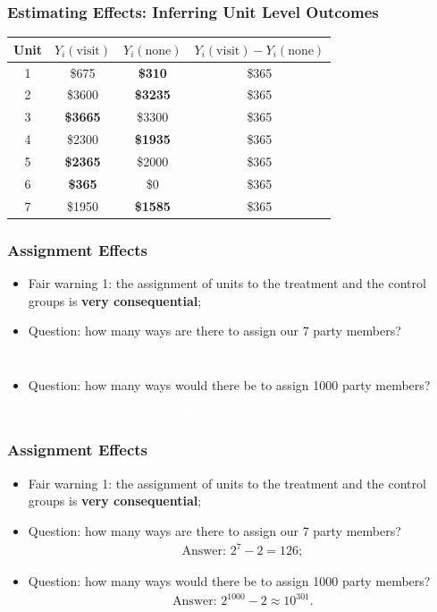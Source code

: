 \documentclass[aspectratio=169]{beamer}
\theoremstyle{principle}
\begin{document}
\begin{frame}
\frametitle{Estimating Effects: Inferring Unit Level Outcomes}
\huge
\begin{table}
\begin{tabular}{ c | c | c | c}
Unit & $Y_i(\mbox{visit})$ & $Y_i(\mbox{none})$ & $Y_i(\mbox{visit}) - Y_i(\mbox{none})$ \\
\hline
\hline
  1 & \$675 & \textbf{\$310} & \$365 \\
  2 & \$3600 & \textbf{\$3235} & \$365 \\
  3 & \textbf{\$3665} & \$3300 & \$365 \\
  4 & \$2300 & \textbf{\$1935} & \$365 \\
  5 & \textbf{\$2365} & \$2000 & \$365 \\
  6 & \textbf{\$365} & \$0 & \$365 \\
  7 & \$1950 & \textbf{\$1585} & \$365 \\
\hline
\hline
\end{tabular}
\end{table}

\end{frame}

\begin{frame}
\frametitle{Assignment Effects}
\begin{itemize}
\item Fair warning 1: the assignment of units to the treatment and the control groups is \textbf{very consequential};
\bigskip
\bigskip
\item Question: how many ways are there to assign our 7 party members?
\begin{align*}
\color{white}\mbox{Answer: }2^7 = 128;
\end{align*}
\bigskip
\item Question: how many ways would there be to assign 1000 party members?
\begin{align*}
\color{white}\mbox{Answer: }2^{1000} = 10^{301}.
\end{align*}
\end{itemize}
\end{frame}

\begin{frame}
\frametitle{Assignment Effects}
\begin{itemize}
\item Fair warning 1: the assignment of units to the treatment and the control groups is \textbf{very consequential};
\bigskip
\bigskip
\item Question: how many ways are there to assign our 7 party members?
\begin{align*}
\mbox{Answer: }2^7 - 2 = 126;
\end{align*}
\bigskip
\item Question: how many ways would there be to assign 1000 party members?
\begin{align*}
\mbox{Answer: }2^{1000} - 2 \approx 10^{301}.
\end{align*}
\end{itemize}
\end{frame}
\end{document}
